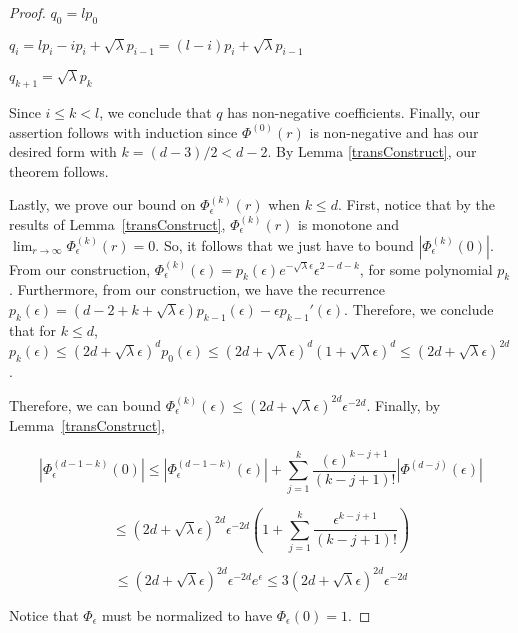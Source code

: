 \begin{proof}
$q_0 = l p_0$

$q_i = lp_i - ip_i + \sqrt{\lambda}p_{i-1} = (l-i)p_i + \sqrt{\lambda}p_{i-1}$ 

$q_{k+1} = \sqrt{\lambda} p_k$

Since $i \leq k < l$, we conclude that $q$ has non-negative coefficients. Finally, our assertion follows with induction since $\Phi^{(0)}(r)$ is non-negative and has our desired form with $k = (d-3)/2 < d-2$. By Lemma \ref{transConstruct}, our theorem follows.

Lastly, we prove our bound on $\Phi_\epsilon^{(k)}(r)$ when $k \leq d$. First, notice that by the results of Lemma~\ref{transConstruct}, $\Phi_\epsilon^{(k)}(r)$ is monotone and $\lim_{r\to\infty}\Phi_\epsilon^{(k)}(r) = 0$. So, it follows that we just have to bound $|\Phi_{\epsilon}^{(k)}(0)|$. From our construction, $\Phi_{\epsilon}^{(k)}(\epsilon) = p_k(\epsilon)e^{-\sqrt{\lambda}\epsilon}\epsilon^{2-d-k}$, for some polynomial $p_k$. Furthermore, from our construction, we have the recurrence $p_{k}(\epsilon) = (d-2+k + \sqrt{\lambda}\epsilon)p_{k-1}(\epsilon) - \epsilon p_{k-1}'(\epsilon)$. Therefore, we conclude that for $k \leq d$, $p_k(\epsilon) \leq (2d + \sqrt{\lambda} \epsilon)^dp_0(\epsilon) \leq  (2d + \sqrt{\lambda} \epsilon)^d(1+\sqrt{\lambda}\epsilon)^d \leq (2d + \sqrt{\lambda}\epsilon)^{2d}$. 

Therefore, we can bound $\Phi_\epsilon^{(k)}(\epsilon) \leq (2d + \sqrt{\lambda}\epsilon)^{2d}\epsilon^{-2d}$. Finally, by Lemma~\ref{transConstruct}, 

\[|\Phi_{\epsilon}^{(d-1-k)}(0)| \leq |\Phi_{\epsilon}^{(d-1-k)}(\epsilon)| + \sum_{j=1}^k \frac{(\epsilon )^{k-j+1}}{(k-j+1)!} |\Phi^{(d-j)}(\epsilon)|\]

\[ \leq (2d + \sqrt{\lambda}\epsilon)^{2d}\epsilon^{-2d} (1 + \sum_{j=1}^k \frac{\epsilon^{k-j+1}}{(k-j+1)!})\]

\[ \leq (2d + \sqrt{\lambda}\epsilon)^{2d}\epsilon^{-2d} e^{\epsilon} \leq 3(2d + \sqrt{\lambda}\epsilon)^{2d}\epsilon^{-2d}\]

Notice that $\Phi_{\epsilon}$ must be normalized to have $\Phi_{\epsilon}(0) = 1$.
\end{proof}



